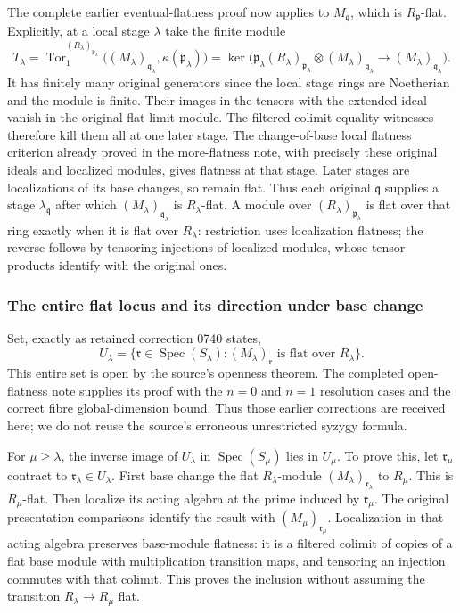 The complete earlier eventual-flatness proof now applies to \(M_{\mathfrak q}\), which is \(R_{\mathfrak p}\)-flat. Explicitly, at a local stage \(\lambda\) take the finite module \[
 T_\lambda=\operatorname{Tor}^{(R_\lambda)_{\mathfrak p_\lambda}}_1
 \big((M_\lambda)_{\mathfrak q_\lambda},\kappa(\mathfrak p_\lambda)\big)
 =\ker\big(\mathfrak p_\lambda(R_\lambda)_{\mathfrak p_\lambda}
       \otimes (M_\lambda)_{\mathfrak q_\lambda}
       \longrightarrow(M_\lambda)_{\mathfrak q_\lambda}\big).
\] It has finitely many original generators since the local stage rings are Noetherian and the module is finite. Their images in the tensors with the extended ideal vanish in the original flat limit module. The filtered-colimit equality witnesses therefore kill them all at one later stage. The change-of-base local flatness criterion already proved in the more-flatness note, with precisely these original ideals and localized modules, gives flatness at that stage. Later stages are localizations of its base changes, so remain flat. Thus each original \(\mathfrak q\) supplies a stage \(\lambda_{\mathfrak q}\) after which \((M_\lambda)_{\mathfrak q_\lambda}\) is \(R_\lambda\)-flat. A module over \((R_\lambda)_{\mathfrak p_\lambda}\) is flat over that ring exactly when it is flat over \(R_\lambda\): restriction uses localization flatness; the reverse follows by tensoring injections of localized modules, whose tensor products identify with the original ones.

\subsubsection{The entire flat locus and its direction under base change}\label{algebra-proof-072-the-entire-flat-locus-and-its-direction-under-base-change}

Set, exactly as retained correction 0740 states, \[
 U_\lambda=\{\mathfrak r\in\operatorname{Spec}(S_\lambda):
                    (M_\lambda)_{\mathfrak r}\text{ is flat over }R_\lambda\}.
\] This entire set is open by the source's openness theorem. The completed open-flatness note supplies its proof with the \(n=0\) and \(n=1\) resolution cases and the correct fibre global-dimension bound. Thus those earlier corrections are received here; we do not reuse the source's erroneous unrestricted syzygy formula.

For \(\mu\ge\lambda\), the inverse image of \(U_\lambda\) in \(\operatorname{Spec}(S_\mu)\) lies in \(U_\mu\). To prove this, let \(\mathfrak r_\mu\) contract to \(\mathfrak r_\lambda\in U_\lambda\). First base change the flat \(R_\lambda\)-module \((M_\lambda)_{\mathfrak r_\lambda}\) to \(R_\mu\). This is \(R_\mu\)-flat. Then localize its acting algebra at the prime induced by \(\mathfrak r_\mu\). The original presentation comparisons identify the result with \((M_\mu)_{\mathfrak r_\mu}\). Localization in that acting algebra preserves base-module flatness: it is a filtered colimit of copies of a flat base module with multiplication transition maps, and tensoring an injection commutes with that colimit. This proves the inclusion without assuming the transition \(R_\lambda\to R_\mu\) flat.

